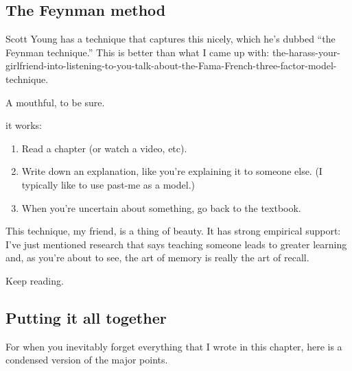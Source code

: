 \subsection{The Feynman method}\label{the-feynman-method}

Scott Young has a technique that captures this nicely, which he's dubbed
``the Feynman technique.'' This is better than what I came up with:
the-harass-your-girlfriend-into-listening-to-you-talk-about-the-Fama-French-three-factor-model-technique.

A mouthful, to be sure.

 it works:

\begin{enumerate}
\def\labelenumi{\arabic{enumi}.}
\itemsep1pt\parskip0pt
\item
  Read a chapter (or watch a video, etc).
\item
  Write down an explanation, like you're explaining it to someone else.
  (I typically like to use past-me as a model.)
\item
  When you're uncertain about something, go back to the textbook.
\end{enumerate}

This technique, my friend, is a thing of beauty. It has strong empirical
support: I've just mentioned research that says teaching someone leads
to greater learning and, as you're about to see, the art of memory is
really the art of recall.

Keep reading.

\subsection{Putting it all together}\label{putting-it-all-together}

For when you inevitably forget everything that I wrote in this chapter,
here is a condensed version of the major points.

